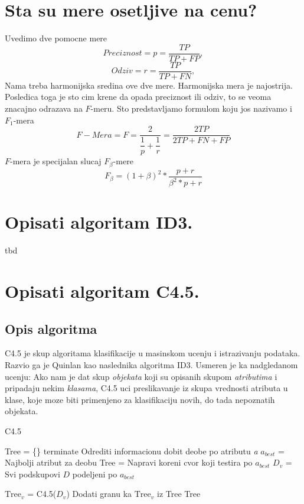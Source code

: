 \documentclass[a4paper]{article}
\begin{document}
\section{Sta su mere osetljive na cenu?}
Uvedimo dve pomocne mere
\[
    Preciznost = p = \dfrac{TP}{TP+FP},
\]
\[
    Odziv = r = \dfrac{TP}{TP+FN},
\]
Nama treba harmonijska sredina ove dve mere. Harmonijska mera je najostrija. Posledica toga je sto
cim krene da opada preciznost ili odziv, to se veoma znacajno odrazava na \(F\)-meru. Sto
predstavljamo formulom koju jos nazivamo i \(F_1\)-mera
\[
    F-Mera = F = \dfrac{2}{\dfrac{1}{p}+\dfrac{1}{r}} = \dfrac{2TP}{2TP + FN + FP}
\]
\(F\)-mera je specijalan slucaj \(F_{\beta}\)-mere
\[
    F_{\beta} = (1+\beta)^2 * \dfrac{p+r}{\beta^2*p + r}
\]

\section{Opisati algoritam ID3.}
tbd
\section{Opisati algoritam C4.5.}
\subsection{Opis algoritma}
C4.5 je skup algoritama klasifikacije u masinskom ucenju i istrazivanju podataka. Razvio ga je
Quinlan kao naslednika algoritma ID3.  Usmeren je ka nadgledanom ucenju: Ako nam je dat skup
\emph{objekata} koji su opisanih skupom \emph{atributima} i pripadaju nekim \emph{klasama}, C4.5 uci
preslikavanje iz skupa vrednosti atributa u klase, koje moze biti primenjeno za klasifikaciju novih,
do tada nepoznatih objekata.

\renewcommand{\algorithmicrequire}{\textbf{Input:}}

\begin{algorithm}
\caption{C4.5}\label{code:c4.5}
\begin{algorithmic}[1]
    \State Tree = \{\}
    \State terminate
    \EndIf
        \State Odrediti informacionu dobit deobe po atributu \emph{a}
    \EndFor
    \State \(a_{best}\) = Najbolji atribut za deobu
    \State Tree = Napravi koreni cvor koji testira po \(a_{best}\)
    \State \(D_v\) = Svi podskupovi \(D\) podeljeni po \(a_{best}\)

        \State \(\text{Tree}_v\) = C4.5(\(D_v\))
        \State Dodati granu ka \(\text{Tree}_v\) iz Tree
    \EndFor
    \State \Return Tree
\EndProcedure
\end{algorithmic}
\end{algorithm}
\end{document}
